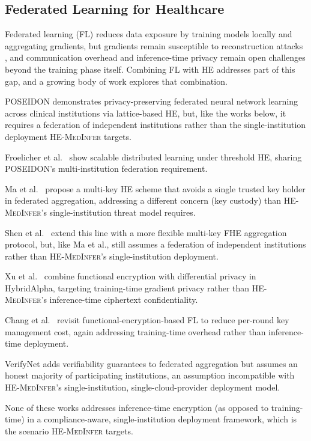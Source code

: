 \documentclass[journal,compsoc]{IEEEtran}
\newcommand{\framework}{\textsc{HE-MedInfer}}
\begin{document}
\subsection{Federated Learning for Healthcare}

Federated learning (FL) reduces data exposure by training models locally and
aggregating gradients, but gradients remain susceptible to reconstruction
attacks \cite{zhu2022securehealth}, and communication overhead and
inference-time privacy remain open challenges beyond the training phase
itself. Combining FL with HE addresses part of this gap, and a growing body
of work explores that combination.

POSEIDON \cite{sav2021poseidon} demonstrates privacy-preserving federated
neural network learning across clinical institutions via lattice-based HE,
but, like the works below, it requires a federation of independent
institutions rather than the single-institution deployment \framework{}
targets.

Froelicher et al.~\cite{froelicher2021scalable} show scalable distributed
learning under threshold HE, sharing POSEIDON's multi-institution federation
requirement.

Ma et al.~\cite{ma2022federated} propose a
multi-key HE scheme that avoids a single trusted key holder in federated
aggregation, addressing a different concern (key custody) than
\framework{}'s single-institution threat model requires.

Shen et al.~\cite{shen2024multikey} extend this line with a more
flexible multi-key FHE aggregation protocol, but, like Ma et al., still
assumes a federation of independent institutions rather than \framework{}'s
single-institution deployment.

Xu et al.~\cite{xu2019hybridalpha} combine functional encryption
with differential privacy in HybridAlpha, targeting training-time gradient
privacy rather than \framework{}'s inference-time ciphertext confidentiality.

Chang et
al.~\cite{chang2023functionalfl} revisit functional-encryption-based FL
to reduce per-round key management cost, again addressing training-time
overhead rather than inference-time deployment.

VerifyNet \cite{xu2020verifynet}
adds verifiability guarantees to federated aggregation but assumes an
honest majority of participating institutions, an assumption incompatible
with \framework{}'s single-institution, single-cloud-provider deployment
model.

None of these works addresses
inference-time encryption (as opposed to training-time) in a
compliance-aware, single-institution deployment framework, which is the
scenario \framework{} targets.
\end{document}
